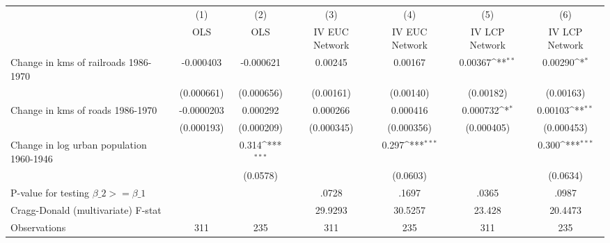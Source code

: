 {
\def\sym#1{\ifmmode^{#1}\else\(^{#1}\)\fi}
\begin{tabular}{l*{6}{c}}
\hline\hline
                &\multicolumn{1}{c}{(1)}&\multicolumn{1}{c}{(2)}&\multicolumn{1}{c}{(3)}&\multicolumn{1}{c}{(4)}&\multicolumn{1}{c}{(5)}&\multicolumn{1}{c}{(6)}\\
                &\multicolumn{1}{c}{OLS}&\multicolumn{1}{c}{OLS}&\multicolumn{1}{c}{IV EUC Network}&\multicolumn{1}{c}{IV EUC Network}&\multicolumn{1}{c}{IV LCP Network}&\multicolumn{1}{c}{IV LCP Network}\\
\hline
Change in kms of railroads 1986-1970&-0.000403         &-0.000621         &  0.00245         &  0.00167         &  0.00367\sym{**} &  0.00290\sym{*}  \\
                &(0.000661)         &(0.000656)         &(0.00161)         &(0.00140)         &(0.00182)         &(0.00163)         \\
[1em]
Change in kms of roads 1986-1970&-0.0000203         & 0.000292         & 0.000266         & 0.000416         & 0.000732\sym{*}  &  0.00103\sym{**} \\
                &(0.000193)         &(0.000209)         &(0.000345)         &(0.000356)         &(0.000405)         &(0.000453)         \\
[1em]
Change in log urban population 1960-1946&                  &    0.314\sym{***}&                  &    0.297\sym{***}&                  &    0.300\sym{***}\\
                &                  & (0.0578)         &                  & (0.0603)         &                  & (0.0634)         \\
\hline
P-value for testing $\beta\_{2} >= \beta\_{1}$&                  &                  &    .0728         &    .1697         &    .0365         &    .0987         \\
Cragg-Donald (multivariate) F-stat&                  &                  &  29.9293         &  30.5257         &   23.428         &  20.4473         \\
Observations    &      311         &      235         &      311         &      235         &      311         &      235         \\
\hline\hline
\end{tabular}
}
